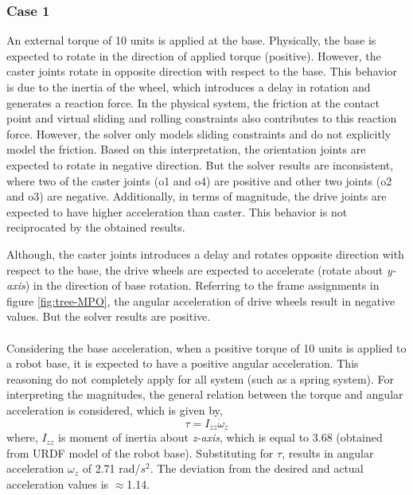 \subsubsection*{Case 1}
\hspace{20pt}An external torque of 10 units is applied at the base. Physically, the base is expected to rotate in the direction of applied torque (positive). However, the caster joints rotate in opposite direction with respect to the base. This behavior is due to the inertia of the wheel, which introduces a delay in rotation and generates a reaction force. In the physical system, the friction at the contact point and virtual sliding and rolling constraints also contributes to this reaction force. However, the solver only models sliding constraints and do not explicitly model the friction. Based on this interpretation, the orientation joints are expected to rotate in negative direction. But the solver results are inconsistent, where two of the caster joints (o1 and o4) are positive and other two joints (o2 and o3) are negative. Additionally, in terms of magnitude, the drive joints are expected to have higher acceleration than caster. This behavior is not reciprocated by the obtained results. 


Although, the caster joints introduces a delay and rotates opposite direction with respect to the base, the drive wheels are expected to accelerate (rotate about \textit{y-axis}) in the direction of base rotation. Referring to the frame assignments in figure \ref{fig:tree-MPO}, the angular acceleration of drive wheels result in negative values. But the solver results are positive.  

\paragraph{}Considering the base acceleration, when a positive torque of 10 units is applied to a robot base, it is expected to have a positive angular acceleration. This reasoning do not completely apply for all system (such as a spring system). For interpreting the magnitudes, the general relation between the torque and angular acceleration is considered, which is given by,
\begin{equation}\label{eq:t}
\tau = I_{zz} \dot{\omega}_z
\end{equation}
where, $I_{zz}$ is moment of inertia about \textit{z-axis}, which is equal to 3.68 (obtained from URDF model of the robot base). Substituting for $\tau$, results in angular acceleration $\omega_z$ of 2.71 rad/$s^2$. The deviation from the desired and actual acceleration values is $\approx$1.14. 

